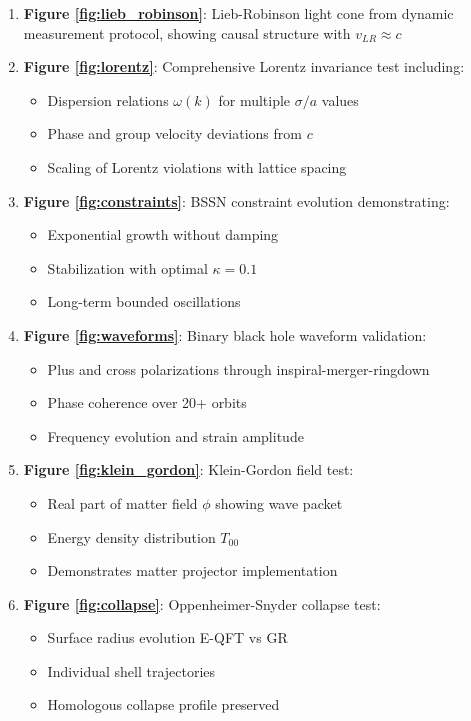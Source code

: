 \documentclass[11pt,a4paper]{article}
\begin{document}
\begin{enumerate}
\item \textbf{Figure \ref{fig:lieb_robinson}}: Lieb-Robinson light cone from dynamic measurement protocol, showing causal structure with $v_{LR} \approx c$
\item \textbf{Figure \ref{fig:lorentz}}: Comprehensive Lorentz invariance test including:
   \begin{itemize}
   \item Dispersion relations $\omega(k)$ for multiple $\sigma/a$ values
   \item Phase and group velocity deviations from $c$
   \item Scaling of Lorentz violations with lattice spacing
   \end{itemize}
\item \textbf{Figure \ref{fig:constraints}}: BSSN constraint evolution demonstrating:
   \begin{itemize}
   \item Exponential growth without damping
   \item Stabilization with optimal $\kappa = 0.1$
   \item Long-term bounded oscillations
   \end{itemize}
\item \textbf{Figure \ref{fig:waveforms}}: Binary black hole waveform validation:
   \begin{itemize}
   \item Plus and cross polarizations through inspiral-merger-ringdown
   \item Phase coherence over 20+ orbits
   \item Frequency evolution and strain amplitude
   \end{itemize}
\item \textbf{Figure \ref{fig:klein_gordon}}: Klein-Gordon field test:
   \begin{itemize}
   \item Real part of matter field $\phi$ showing wave packet
   \item Energy density distribution $T_{00}$
   \item Demonstrates matter projector implementation
   \end{itemize}
\item \textbf{Figure \ref{fig:collapse}}: Oppenheimer-Snyder collapse test:
   \begin{itemize}
   \item Surface radius evolution E-QFT vs GR
   \item Individual shell trajectories
   \item Homologous collapse profile preserved
   \end{itemize}
\end{enumerate}
\end{document}
